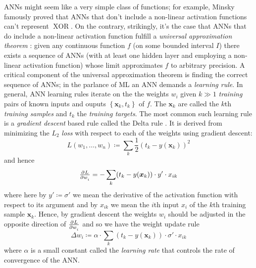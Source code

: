 ANNs might seem like a very simple class of functions; for example, Minsky \etal \cite{minsky2017perceptrons} famously proved that ANNs that don't include a non-linear activation functions can't represent \(\operatorname{XOR}\). 
%
On the contrary, strikingly, it's the case that ANNs that do include a non-linear activation function fulfill a \textit{universal approximation theorem} \cite{cybenko1989approximation}:
%
given any continuous function \(f\) (on some bounded interval \(I\)) there exists a sequence of ANNs (with at least one hidden layer and employing a non-linear activation function) whose limit approximates \(f\) to arbitrary precision.
%
A critical component of the universal approximation theorem is finding the correct sequence of ANNs; in the parlance of ML an ANN demands a \textit{learning rule}.
%
In general, ANN learning rules iterate on the the weights \(w_i\) given \(k \gg 1\) \textit{training} pairs of known inputs and ouputs \(\left\{ \bm{x}_k, t_k \right\}\) of \(f\). 
%
The \(\mathbf{x}_k\) are called the \(k\)th \textit{training samples} and \(t_k\) the  \textit{training targets}.
%
The most common such learning rule is a \textit{gradient descent} based rule called the Delta rule \cite{widrow1960adaptive}.
%
It is derived from minimizing the \(L_2\) \textit{loss} with respect to each of the weights using gradient descent:
\begin{equation}
    L(w_1, \dots, w_n) \coloneqq \sum_k \frac{1}{2} (t_k - y(\mathbf{x}_k))^2
    \label{eqn:loss}
\end{equation}
and hence
\begin{equation}
    \pd{L}{w_i} = - \sum_k(t_k-y(\bm{x}_k))\cdot y'\cdot x_{ik}
\end{equation}
where here by \(y' \coloneqq \sigma'\) we mean the derivative of the activation function with respect to its argument and by \(x_{ik}\) we mean the \(i\)th input \(x_i\) of the \(k\)th training sample \(\bm{x}_k\).
%
Hence, by gradient descent the weights \(w_i\) should be adjusted in the opposite direction of \(\pd{L}{w_i}\) and so we have the weight update rule
\begin{equation}
    \Delta w_i \coloneqq \alpha \cdot \sum_k(t_k-y(\mathbf{x}_k))\cdot \sigma'\cdot x_{ik}
    \label{eqn:batchupdate}
\end{equation}
where \(\alpha\) is a small constant called the \textit{learning rate} that controls the rate of convergence of the ANN.

